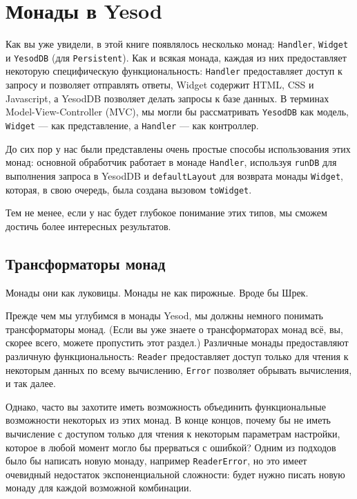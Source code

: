 \chapter{Монады в Yesod}\label{chap:yesod_monads}

Как вы уже увидели, в этой книге появлялось несколько монад: \lstinline'Handler',
\lstinline'Widget' и \lstinline'YesodDB'
(для \lstinline'Persistent'). Как и всякая монада, каждая из них предоставляет некоторую
специфическую функциональность: \lstinline'Handler' предоставляет доступ к запросу и
позволяет
отправлять ответы, Widget содержит HTML, CSS и Javascript, а YesodDB позволяет делать
запросы к базе данных. В терминах Model-View-Controller (MVC), мы могли бы рассматривать
\lstinline'YesodDB' как модель, \lstinline'Widget' --- как представление, а
\lstinline'Handler' --- как контроллер.

До сих пор у нас были представлены очень простые способы использования этих монад: 
основной обработчик работает в монаде \lstinline'Handler', используя \lstinline'runDB' для
выполнения запроса в YesodDB и \lstinline'defaultLayout' для возврата монады
\lstinline'Widget', которая, в свою очередь, была создана
вызовом \lstinline'toWidget'.

Тем не менее, если у нас будет глубокое понимание этих типов, мы сможем достичь более интересных результатов.

\section{Трансформаторы монад}
Монады они как луковицы. Монады не как пирожные. Вроде бы Шрек.

Прежде чем мы углубимся в монады Yesod, мы должны немного понимать трансформаторы монад. 
(Если вы уже знаете о трансформаторах монад всё, вы, скорее всего, можете пропустить этот
раздел.) Различные монады предоставляют различную функциональность: \lstinline'Reader'
предоставляет доступ только для чтения к некоторым данных по всему вычислению,
\lstinline'Error' позволяет обрывать вычисления, и так далее.

Однако, часто вы захотите иметь возможность объединить функциональные возможности 
некоторых из этих монад. В конце концов, почему бы не иметь вычисление с доступом только
для чтения к некоторым параметрам настройки, которое в любой момент могло бы прерваться с
ошибкой? Одним из подходов было бы написать новую монаду, например
\lstinline'ReaderError', но это имеет очевидный недостаток экспоненциальной сложности:
будет нужно писать новую монаду для каждой возможной комбинации.

